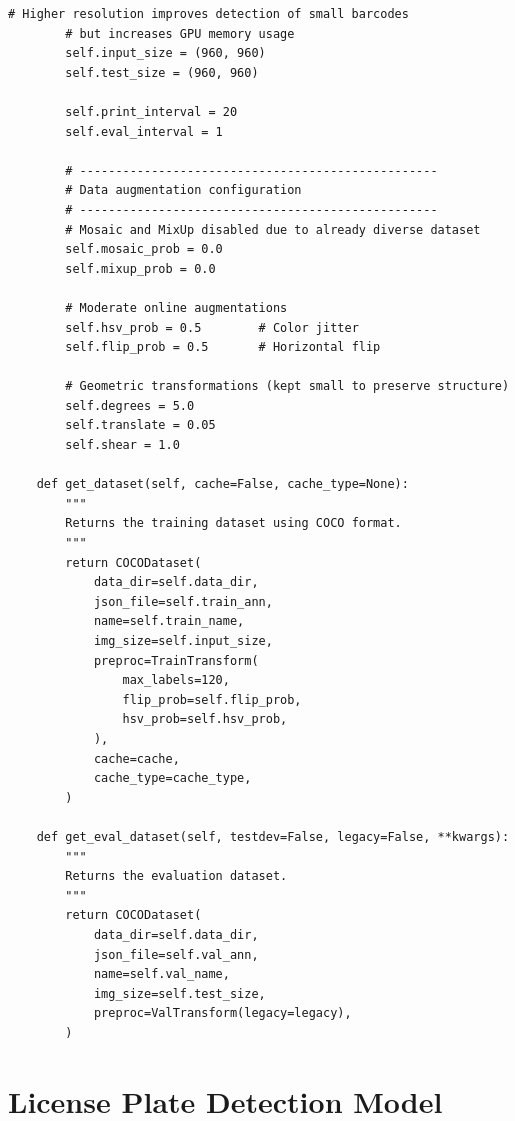 \begin{lstlisting}[caption={YOLOX experiment file for QR and barcode detection}, label={lst:yolox_barcode}]
        # Higher resolution improves detection of small barcodes
        # but increases GPU memory usage
        self.input_size = (960, 960)
        self.test_size = (960, 960)

        self.print_interval = 20
        self.eval_interval = 1

        # --------------------------------------------------
        # Data augmentation configuration
        # --------------------------------------------------
        # Mosaic and MixUp disabled due to already diverse dataset
        self.mosaic_prob = 0.0
        self.mixup_prob = 0.0

        # Moderate online augmentations
        self.hsv_prob = 0.5        # Color jitter
        self.flip_prob = 0.5       # Horizontal flip

        # Geometric transformations (kept small to preserve structure)
        self.degrees = 5.0
        self.translate = 0.05
        self.shear = 1.0

    def get_dataset(self, cache=False, cache_type=None):
        """
        Returns the training dataset using COCO format.
        """
        return COCODataset(
            data_dir=self.data_dir,
            json_file=self.train_ann,
            name=self.train_name,
            img_size=self.input_size,
            preproc=TrainTransform(
                max_labels=120,
                flip_prob=self.flip_prob,
                hsv_prob=self.hsv_prob,
            ),
            cache=cache,
            cache_type=cache_type,
        )

    def get_eval_dataset(self, testdev=False, legacy=False, **kwargs):
        """
        Returns the evaluation dataset.
        """
        return COCODataset(
            data_dir=self.data_dir,
            json_file=self.val_ann,
            name=self.val_name,
            img_size=self.test_size,
            preproc=ValTransform(legacy=legacy),
        )
\end{lstlisting}

\section{License Plate Detection Model}

